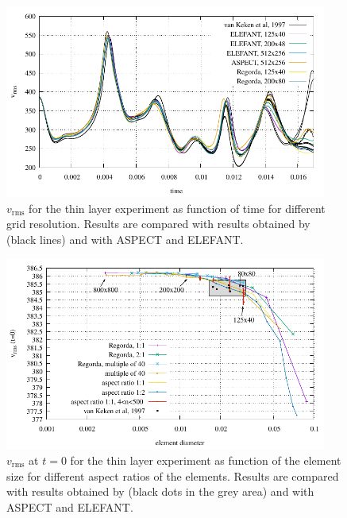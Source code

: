 \begin{figure}
\centering
\includegraphics[width=400px]{./Figures/vrms_thin.pdf}
\caption{$v_{\textrm{rms}}$ for the thin layer experiment as function of time for different grid resolution. Results are compared with results obtained by
\citet{vanKeken1997} (black lines) and with ASPECT and ELEFANT.}
\label{fig:thin}
\end{figure}

\begin{figure}
\centering
\includegraphics[width=400px]{./Figures/vrmszero.pdf}
\caption{$v_{\textrm{rms}}$ at $t=0$ for the thin layer experiment as function of the element size for different aspect ratios of the elements. Results are compared
with results obtained by \citet{vanKeken1997} (black dots in the grey area) and with ASPECT and ELEFANT.}
\label{fig:thin_initial}
\end{figure}